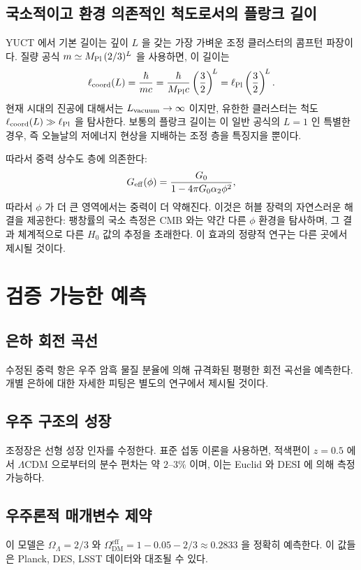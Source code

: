\documentclass[12pt,a4paper]{article}
\begin{document}
	\subsection{국소적이고 환경 의존적인 척도로서의 플랑크 길이}
	YUCT 에서 기본 길이는 깊이 \(L\) 을 갖는 가장 가벼운 조정 클러스터의 콤프턴 파장이다. 질량 공식 \(m \simeq M_{\rm Pl}\,(2/3)^L\) 을 사용하면, 이 길이는
	\begin{equation}
		\ell_{\rm coord}(L) = \frac{\hbar}{m c}
		= \frac{\hbar}{M_{\rm Pl}c} \left(\frac{3}{2}\right)^{\!L}
		= \ell_{\rm Pl} \left(\frac{3}{2}\right)^{\!L}.
		\label{eq:length-from-L}
	\end{equation}
	현재 시대의 진공에 대해서는 \(L_{\rm vacuum}\to\infty\) 이지만, 유한한 클러스터는 척도 \(\ell_{\rm coord}(L) \gg \ell_{\rm Pl}\) 을 탐사한다. 보통의 플랑크 길이는 이 일반 공식의 \(L=1\) 인 특별한 경우, 즉 오늘날의 저에너지 현상을 지배하는 조정 층을 특징지을 뿐이다.
	
	따라서 중력 상수도 층에 의존한다:
	\begin{equation}
		G_{\rm eff}(\phi) = \frac{G_0}{1-4\pi G_0\alpha_2\phi^2},
		\label{eq:Geff-layer}
	\end{equation}
	따라서 \(\phi\) 가 더 큰 영역에서는 중력이 더 약해진다. 이것은 허블 장력의 자연스러운 해결을 제공한다: 팽창률의 국소 측정은 CMB 와는 약간 다른 \(\phi\) 환경을 탐사하며, 그 결과 체계적으로 다른 \(H_0\) 값의 추정을 초래한다. 이 효과의 정량적 연구는 다른 곳에서 제시될 것이다.
	
	\section{검증 가능한 예측}
	
	\subsection{은하 회전 곡선}
	수정된 중력 항은 우주 암흑 물질 분율에 의해 규격화된 평평한 회전 곡선을 예측한다. 개별 은하에 대한 자세한 피팅은 별도의 연구에서 제시될 것이다.
	
	\subsection{우주 구조의 성장}
	조정장은 선형 성장 인자를 수정한다. 표준 섭동 이론을 사용하면, 적색편이 \(z=0.5\) 에서 \(\Lambda\)CDM 으로부터의 분수 편차는 약 \(2\)–\(3\%\) 이며, 이는 Euclid 와 DESI 에 의해 측정 가능하다.
	
	\subsection{우주론적 매개변수 제약}
	이 모델은 \(\Omega_\Lambda = 2/3\) 와 \(\Omega_{\mathrm{DM}}^{\mathrm{eff}} = 1 - 0.05 - 2/3 \approx 0.2833\) 을 정확히 예측한다. 이 값들은 Planck, DES, LSST 데이터와 대조될 수 있다.
	
\end{document}
